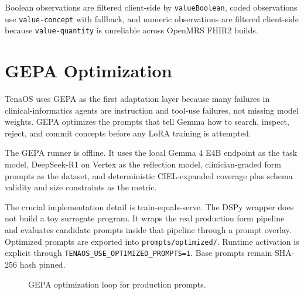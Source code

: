 \documentclass[11pt]{article}
\newcommand{\Product}{TenaOS}
\newcommand{\Gemma}{Gemma 4 E4B}
\newcommand{\OpenMRS}{OpenMRS}
\begin{document}
Boolean observations are filtered client-side by \texttt{valueBoolean}, coded observations use \texttt{value-concept} with fallback, and numeric observations are filtered client-side because \texttt{value-quantity} is unreliable across \OpenMRS{} FHIR2 builds.

\section{GEPA Optimization}

\Product{} uses GEPA as the first adaptation layer because many failures in clinical-informatics agents are instruction and tool-use failures, not missing model weights. GEPA optimizes the prompts that tell Gemma how to search, inspect, reject, and commit concepts before any LoRA training is attempted.

The GEPA runner is offline. It uses the local \Gemma{} endpoint as the task model, DeepSeek-R1 on Vertex as the reflection model, clinician-graded form prompts as the dataset, and deterministic CIEL-expanded coverage plus schema validity and size constraints as the metric.

The crucial implementation detail is train-equals-serve. The DSPy wrapper does not build a toy surrogate program. It wraps the real production form pipeline and evaluates candidate prompts inside that pipeline through a prompt overlay. Optimized prompts are exported into \texttt{prompts/optimized/}. Runtime activation is explicit through \texttt{TENAOS\_USE\_OPTIMIZED\_PROMPTS=1}. Base prompts remain SHA-256 hash pinned.

\begin{figure}[h]
\centering
{}
\caption{GEPA optimization loop for production prompts.}
\end{figure}
\end{document}
